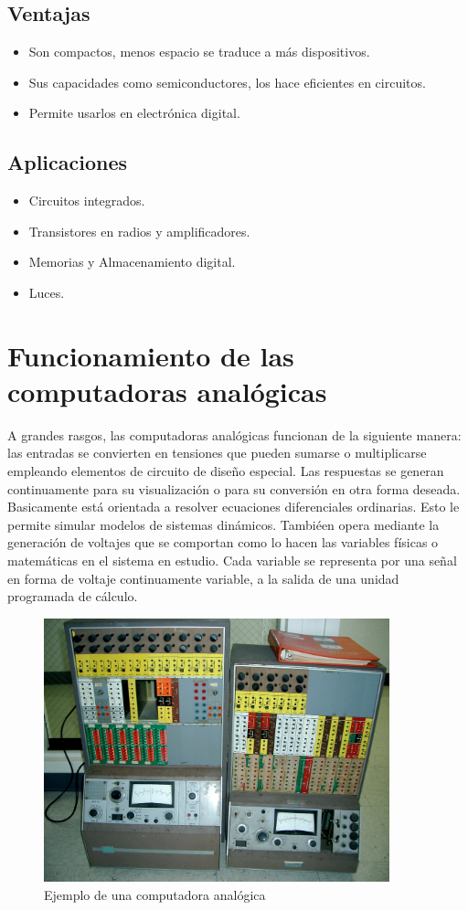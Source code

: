 \documentclass[letterpaper, 12pt]{article}
\begin{document}
\begin{justify}
        \subsection{Ventajas}
        \begin{itemize}
            \item Son compactos, menos espacio se traduce a más dispositivos.
            \item Sus capacidades como semiconductores, los hace eficientes en circuitos.
            \item Permite usarlos en electrónica digital.
        \end{itemize}
        \subsection{Aplicaciones}
        \begin{itemize}
            \item Circuitos integrados.
            \item Transistores en radios y amplificadores.
            \item Memorias y Almacenamiento digital.
            \item Luces.
        \end{itemize}
        \section{Funcionamiento de las computadoras analógicas}
        A grandes rasgos, las computadoras analógicas funcionan de la siguiente manera: las entradas se convierten en tensiones que pueden sumarse o multiplicarse empleando elementos de circuito de diseño especial. Las respuestas se generan continuamente para su visualización o para
        su conversión en otra forma deseada. Basicamente está orientada a resolver ecuaciones diferenciales ordinarias. Esto le permite simular modelos de sistemas dinámicos. Tambiéen opera mediante la generación de voltajes que se comportan como lo hacen las variables físicas o matemáticas
        en el sistema en estudio. Cada variable se representa por una señal en forma de voltaje continuamente variable, a la salida de una unidad programada de cálculo.
        \begin{figure}[H]
            \centering
            \includegraphics[width=10cm]{analog.jpg}
            \caption{Ejemplo de una computadora analógica}
            \label{fig:analog}
        \end{figure}

\end{justify}
\end{document}
